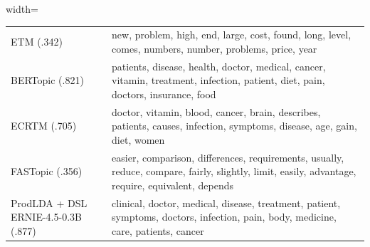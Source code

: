 \begin{table}[t]
\begin{adjustbox}{width=\linewidth}
\begin{tabular}{@{}l l@{}}
    {\tiny ETM (.342)} & \textcolor{green!60!black}{new}, \textcolor{black!70}{problem}, \textcolor{green!90!black}{high}, \textcolor{black!40}{end}, \textcolor{green!90!black}{large}, \textcolor{green!60!black}{cost}, \textcolor{black!40}{found}, \textcolor{black!40}{long}, \textcolor{green!40!black}{level}, \textcolor{black!70}{comes}, \textcolor{black!70}{numbers}, \textcolor{green!60!black}{number}, \textcolor{green!40!black}{problems}, \textcolor{green!90!black}{price}, \textcolor{green!40!black}{year} \\
    {\tiny BERTopic (.821)} & \textcolor{green!90!black}{patients}, \textcolor{green!60!black}{disease}, \textcolor{green!40!black}{health}, \textcolor{green!60!black}{doctor}, \textcolor{green!90!black}{medical}, \textcolor{green!40!black}{cancer}, \textcolor{black!70}{vitamin}, \textcolor{green!60!black}{treatment}, \textcolor{black!40}{infection}, \textcolor{green!90!black}{patient}, \textcolor{black!70}{diet}, \textcolor{black!70}{pain}, \textcolor{green!40!black}{doctors}, \textcolor{black!40}{insurance}, \textcolor{black!40}{food} \\
    {\tiny ECRTM (.705)} & \textcolor{green!60!black}{doctor}, \textcolor{green!40!black}{vitamin}, \textcolor{green!40!black}{blood}, \textcolor{green!60!black}{cancer}, \textcolor{black!40}{brain}, \textcolor{black!40}{describes}, \textcolor{green!90!black}{patients}, \textcolor{green!40!black}{causes}, \textcolor{black!70}{infection}, \textcolor{green!90!black}{symptoms}, \textcolor{green!60!black}{disease}, \textcolor{black!70}{age}, \textcolor{black!40}{gain}, \textcolor{green!90!black}{diet}, \textcolor{black!70}{women} \\
    {\tiny FASTopic (.356)} & \textcolor{green!40!black}{easier}, \textcolor{black!40}{comparison}, \textcolor{green!60!black}{differences}, \textcolor{green!40!black}{requirements}, \textcolor{green!90!black}{usually}, \textcolor{black!70}{reduce}, \textcolor{black!70}{compare}, \textcolor{green!60!black}{fairly}, \textcolor{green!90!black}{slightly}, \textcolor{green!60!black}{limit}, \textcolor{black!40}{easily}, \textcolor{green!40!black}{advantage}, \textcolor{green!90!black}{require}, \textcolor{black!70}{equivalent}, \textcolor{black!40}{depends} \\
    {\tiny ProdLDA + DSL ERNIE-4.5-0.3B (.877)} & \textcolor{green!90!black}{clinical}, \textcolor{green!60!black}{doctor}, \textcolor{green!60!black}{medical}, \textcolor{green!40!black}{disease}, \textcolor{green!60!black}{treatment}, \textcolor{green!90!black}{patient}, \textcolor{green!40!black}{symptoms}, \textcolor{black!70}{doctors}, \textcolor{green!40!black}{infection}, \textcolor{black!40}{pain}, \textcolor{black!40}{body}, \textcolor{black!70}{medicine}, \textcolor{black!40}{care}, \textcolor{green!90!black}{patients}, \textcolor{black!70}{cancer} \\

\end{tabular}
\end{adjustbox}
\end{table}
